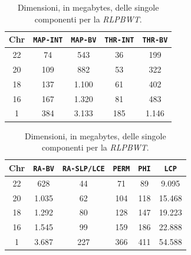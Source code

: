 \begin{table}
  \centering
  \caption{Dimensioni, in megabytes, delle singole componenti per la
    \textit{RLPBWT}.} 
  \label{tab:comp}
  \begin{tabular}{c||c|c|c|c}
    \textbf{Chr} & \textbf{\texttt{MAP-INT}} & \textbf{\texttt{MAP-BV}}
    & \textbf{\texttt{THR-INT}} & \textbf{\texttt{THR-BV}} \\
    \hline
    \hline
    22 & 74 & 543 & 36 & 199\\ \hline
    20 & 109 & 882 & 53 & 322\\ \hline
    18 & 137 & 1.100 & 61 & 402\\ \hline
    16 & 167 & 1.320 & 81 & 483\\ \hline
    1 & 384 & 3.133 & 185 & 1.146
  \end{tabular}
   \vspace{+3mm}
 \vspace{+1mm}
  \begin{tabular}{c||c|c|c|c|c}
    \textbf{Chr} & \textbf{\texttt{RA-BV}} & \textbf{\texttt{RA-SLP/LCE}}
    & \textbf{\texttt{PERM}} & \textbf{\texttt{PHI}} & \textbf{\texttt{LCP}}\\
    \hline
    \hline
    22 & 628 & 44 & 71 & 89 & 9.095\\ \hline
    20 & 1.035 & 62 & 104 & 118 & 15.468 \\ \hline
    18 & 1.292 & 80 & 128 & 147 & 19.223 \\ \hline
    16 & 1.545 & 99 & 159 & 186 & 22.888\\ \hline
    1 & 3.687 & 227 & 366 & 411 & 54.588
  \end{tabular}
\end{table}
